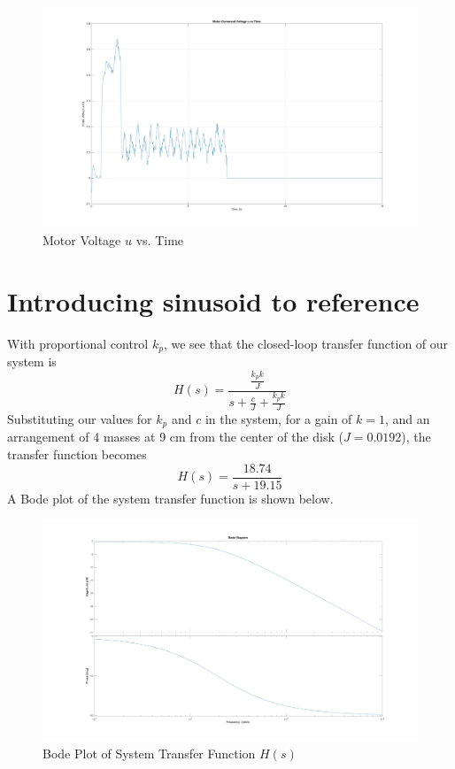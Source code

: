 \documentclass[11pt,titlepage]{article}
\begin{document}
	\begin{figure}[h!]
		\centering
		\includegraphics[trim={6cm 0 0 0},clip,angle=0,origin=c,scale=0.2]{u_vs_time}
		\caption{Motor Voltage $u$ vs. Time}
		\label{fig:u_vs_time}
	\end{figure}
	
\section{Introducing sinusoid to reference}
	With proportional control $k_p$, we see that the closed-loop transfer function of our system is 
	\begin{equation}
		H(s)=\frac{\frac{k_pk}{J}}{s+\frac{c}{J}+\frac{k_pk}{J}}
	\end{equation}
	Substituting our values for $k_p$ and $c$ in the system, for a gain of $k=1$, and an arrangement of 4 masses at 9 cm from the center of the disk ($J = 0.0192$), the transfer function becomes 
	\begin{equation}
		H(s)=\frac{18.74}{s + 19.15}
	\end{equation}
	A Bode plot of the system transfer function is shown below. 

	\begin{figure}[h!]
		\centering
		\includegraphics[trim={6cm 0 0 0},clip,angle=0,origin=c,scale=0.2]{bode_Hs}
		\caption{Bode Plot of System Transfer Function $H(s)$}
		\label{fig:bode_Hs}
	\end{figure}
	
\end{document}

